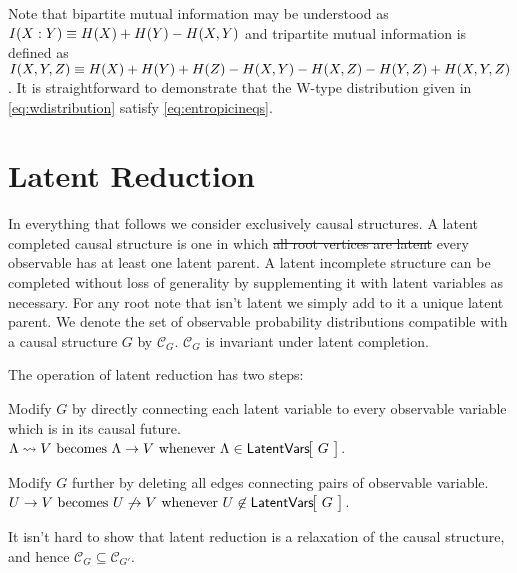 Note that bipartite mutual information may be understood as $I\lparen X:Y\rparen\equiv H\lparen X\rparen+H\lparen Y\rparen-H\lparen X,Y\rparen$ and tripartite mutual information is defined as $I\lparen X,Y,Z\rparen\equiv H\lparen X\rparen+H\lparen Y\rparen+H\lparen Z\rparen-H\lparen X,Y\rparen-H\lparen X,Z\rparen-H\lparen Y,Z\rparen+H\lparen X,Y,Z\rparen$. It is straightforward to demonstrate that the W-type distribution given in \cref{eq:wdistribution} satisfy  \cref{eq:entropicineqs}.






\section{Latent Reduction }\label{sec:LR}

In everything that follows we consider exclusively  causal structures. A latent completed causal structure is one in which \sout{all root vertices are latent} every observable has at least one latent parent. A latent incomplete structure can be completed without loss of generality by supplementing it with latent variables as necessary. For any root note that isn't latent we simply add to it a unique latent parent.  
We denote the set of observable probability distributions compatible with a causal structure $G$ by $\mathcal{C}_G$. $\mathcal{C}_G$ is invariant under latent completion.

The operation of latent reduction has two steps:

\begin{compactenum}
\item Modify $G$ by directly connecting each latent variable to every observable variable which is in its causal future.\\ ${\Lambda \leadsto V \text{ becomes } \Lambda \to V \text{ whenever } \Lambda\in \NamedFunction{LatentVars}{\!G\!}}$.
\item Modify $G$ further by deleting all edges connecting pairs of observable variable.\\ ${U \to V \text{ becomes } U \not\to V \text{ whenever } U\not\in \NamedFunction{LatentVars}{\!G\!}}$.
\end{compactenum}


It isn't hard to show that latent reduction is a relaxation of the causal structure, and hence $\mathcal{C}_G \subseteq \mathcal{C}_{G'}$. 

